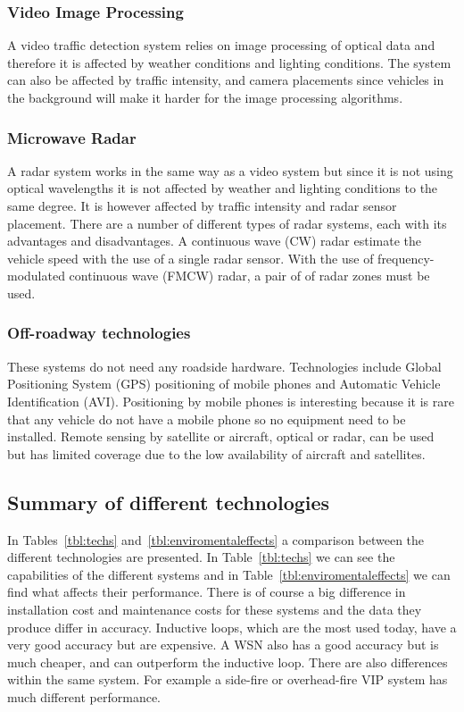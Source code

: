 \subsubsection{Video Image Processing}

A video traffic detection system relies on image processing of optical data and therefore it is affected by weather conditions and lighting conditions. The system can also be affected by traffic intensity, and camera placements since vehicles in the background will make it harder for the image processing algorithms. 

\subsubsection{Microwave Radar}

A radar system works in the same way as a video system but since it is not using optical wavelengths it is not affected by weather and lighting conditions to the same degree. It is however affected by traffic intensity and radar sensor placement.
There are a number of different types of radar systems, each with its advantages and disadvantages. A continuous wave (CW) radar estimate the vehicle speed with the use of a single radar sensor. With the use of frequency-modulated continuous wave (FMCW) radar, a pair of of radar zones must be used.

\subsubsection{Off-roadway technologies}
These systems do not need any roadside hardware. Technologies include Global Positioning System (GPS) positioning of mobile phones and Automatic Vehicle Identification (AVI). Positioning by mobile phones is interesting because it is rare that any vehicle do not have a mobile phone so no equipment need to be installed. Remote sensing by satellite or aircraft, optical or radar, can be used but has limited coverage due to the low availability of aircraft and satellites.

\subsection{Summary of different technologies}
In Tables~\ref{tbl:techs} and~\ref{tbl:enviromentaleffects} a comparison between the different technologies are presented. In Table~\ref{tbl:techs} we can see the capabilities of the different systems and in Table~\ref{tbl:enviromentaleffects} we can find what affects their performance. There is of course a big difference in installation cost and maintenance costs for these systems and the data they produce differ in accuracy. Inductive loops, which are the most used today, have a very good accuracy but are expensive. A WSN also has a good accuracy but is much cheaper, and can outperform the inductive loop. There are also differences within the same system. For example a side-fire or overhead-fire VIP system has much different performance.

